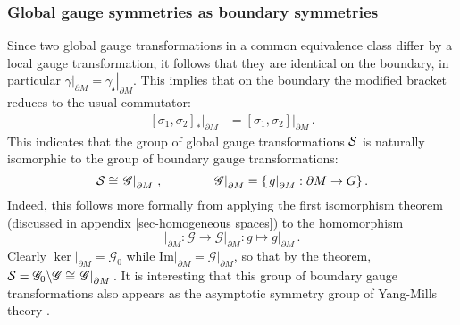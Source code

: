 \documentclass[11pt,a4paper]{article}
\def\calg{{\mathscr G}}
\def\cals{{\cal S}}
\def\calss{{\boldsymbol{\mathscr s}}}
\begin{document}
    
    
    \subsubsection{Global gauge symmetries as boundary symmetries}\label{sec-ASG}
    Since two global gauge transformations in a common equivalence class differ by a local gauge transformation, it follows that they are identical on the boundary, in particular $\left.\gamma\right|_{\partial M}=\left.\gamma_\calss\right|_{\partial M}$. This implies that on the boundary the modified bracket reduces to the usual commutator:
    \begin{align}
    \left.[\sigma_1,\sigma_2]_*\right|_{\partial M}&=\left.[\sigma_1,\sigma_2]\right|_{\partial M}\label{starbound}\,.
    \end{align}
This indicates that the group of global gauge transformations $\cals$ is naturally isomorphic to the group of boundary gauge transformations:
    \begin{equation}
    \cals\cong \left.\calg\right|_{\partial M}\,,\qquad\qquad \left.\calg\right|_{\partial M}=\{\left.g\right|_{\partial M}:\partial M\rightarrow G\}\label{bulkbound}\,.
    \end{equation}
    Indeed, this follows more formally from applying the first isomorphism theorem (discussed in appendix \ref{sec-homogeneous spaces}) to the homomorphism 
    \begin{equation}
    \left.{}\right|_{\partial M} :\calg\rightarrow  \left.\calg\right|_{\partial M} : g \mapsto \left.g\right|_{\partial M}\,.
    \end{equation} 
    Clearly $\ker \left.{}\right|_{\partial M}=\calg_0$ while $\mathrm{Im} \left.{}\right|_{\partial M}=\left.\calg\right|_{\partial M}$, so that by the theorem, $\cals=\calg_0\backslash \calg\cong \left.\calg\right|_{\partial M}$\,. It is interesting that this group of boundary gauge transformations also appears as the asymptotic symmetry group of Yang-Mills theory \cite{Strominger:2013lka, Barnich:2013sxa}.\\ 
    
\end{document}
